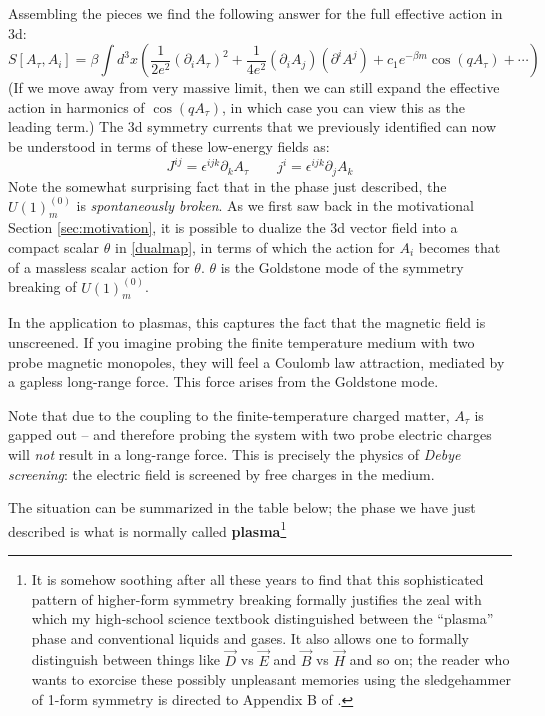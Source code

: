 \documentclass[aps,preprint,nofootinbib,preprintnumbers,eqsecnum,superscriptaddress]{revtex4}
\newcommand{\be}{\begin{equation}}
\newcommand{\ee}{\end{equation}}
\def\le{\left}
\def\ri{\right}
\def\th{{\theta}}
\def\ep{{\epsilon}}
\newcommand{\p}{\partial}
\def\th{{\theta}}
\numberwithin{equation}{section}
\begin{document}
Assembling the pieces we find the following answer for the full effective action in 3d:
\be
S[A_{\tau}, A_i] = \beta \int d^3x \le(\frac{1}{2 e^2} (\p_{i} A_{\tau})^2 + \frac{1}{4 e^2} (\p_i A_j)(\p^i A^j) + c_1 e^{-\beta m} \cos (q A_{\tau}) + \cdots\ri)
\ee
(If we move away from very massive limit, then we can still expand the effective action in harmonics of $\cos(q A_{\tau})$, in which case you can view this as the leading term.) The 3d symmetry currents that we previously identified can now be understood in terms of these low-energy fields as:
\be
J^{ij} = \ep^{ijk} \p_{k} A_{\tau} \qquad j^{i} = \ep^{ijk} \p_{j} A_{k}
\ee
Note the somewhat surprising fact that in the phase just described, the $U(1)^{(0)}_m$ is {\it spontaneously broken}. As we first saw back in the motivational Section \ref{sec:motivation}, it is possible to dualize the 3d vector field into a compact scalar $\th$ in \eqref{dualmap}, in terms of which the action for $A_i$ becomes that of a massless scalar action for $\th$. 
$\th$ is the Goldstone mode of the symmetry breaking of $U(1)^{(0)}_m$. 


In the application to plasmas, this captures the fact that the magnetic field is unscreened. If you imagine probing the finite temperature medium with two probe magnetic monopoles, they will feel a Coulomb law attraction, mediated by a gapless long-range force. This force arises from the Goldstone mode. 

Note that due to the coupling to the finite-temperature charged matter, $A_{\tau}$ is gapped out -- and therefore probing the system with two probe electric charges will {\it not} result in a long-range force. This is precisely the physics of {\it Debye screening}: the electric field is screened by free charges in the medium. 

The situation can be summarized in the table below; the phase we have just described is what is normally called {\bf plasma}\footnote{It is somehow soothing after all these years to find that this sophisticated pattern of higher-form symmetry breaking formally justifies the zeal with which my high-school science textbook distinguished between the ``plasma'' phase and conventional liquids and gases. It also allows one to formally distinguish between things like $\vec{D}$ vs $\vec{E}$ and $\vec{B}$ vs $\vec{H}$ and so on; the reader who wants to exorcise these possibly unpleasant memories using the sledgehammer of 1-form symmetry is directed to Appendix B of \cite{Das:2023nwl}. }
\end{document}
